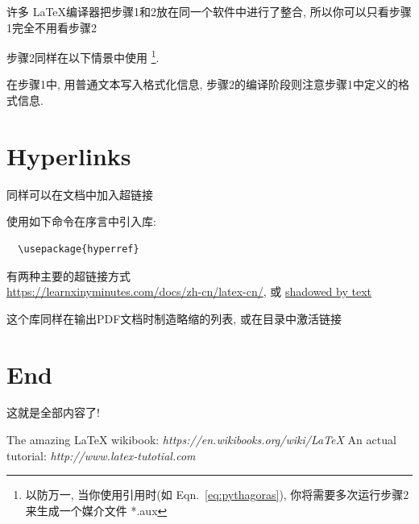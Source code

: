 \documentclass[fontset=adobe, 12pt]{article}
\begin{document}
许多 \LaTeX \hspace{1pt}编译器把步骤1和2放在同一个软件中进行了整合, 所以你可以只看步骤1完全不用看步骤2

步骤2同样在以下情景中使用 \footnote{以防万一, 当你使用引用时(如 Eqn.~\ref{eq:pythagoras}), 你将需要多次运行步骤2来生成一个媒介文件 *.aux}.

在步骤1中, 用普通文本写入格式化信息, 步骤2的编译阶段则注意步骤1中定义的格式信息.


\section{Hyperlinks}
同样可以在文档中加入超链接

使用如下命令在序言中引入库:
\begin{verbatim}
  \usepackage{hyperref}
\end{verbatim}

有两种主要的超链接方式\\
\url{https://learnxinyminutes.com/docs/zh-cn/latex-cn/}, 或
\href{https://learnxinyminutes.com/docs/zh-cn/latex-cn/}{shadowed by text}

这个库同样在输出PDF文档时制造略缩的列表, 或在目录中激活链接

\section{End}

这就是全部内容了!

\begin{thebibliography}{1}
   The amazing \LaTeX \hspace{1pt} wikibook: {\em https://en.wikibooks.org/wiki/LaTeX}
   An actual tutorial: {\em http://www.latex-tutotial.com}
\end{thebibliography}

\end{document}
